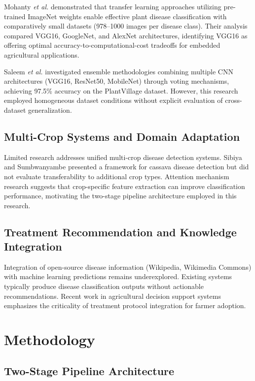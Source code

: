 \documentclass[conference]{IEEEtran}
\begin{document}
Mohanty \textit{et al.} \cite{ref03} demonstrated that transfer learning approaches utilizing pre-trained ImageNet weights enable effective plant disease classification with comparatively small datasets (978--1000 images per disease class). Their analysis compared VGG16, GoogleNet, and AlexNet architectures, identifying VGG16 as offering optimal accuracy-to-computational-cost tradeoffs for embedded agricultural applications.

Saleem \textit{et al.} \cite{ref04} investigated ensemble methodologies combining multiple CNN architectures (VGG16, ResNet50, MobileNet) through voting mechanisms, achieving 97.5\% accuracy on the PlantVillage dataset. However, this research employed homogeneous dataset conditions without explicit evaluation of cross-dataset generalization.

\subsection{Multi-Crop Systems and Domain Adaptation}

Limited research addresses unified multi-crop disease detection systems. Sibiya and Sumbwanyambe \cite{ref05} presented a framework for cassava disease detection but did not evaluate transferability to additional crop types. Attention mechanism research \cite{ref06} suggests that crop-specific feature extraction can improve classification performance, motivating the two-stage pipeline architecture employed in this research.

\subsection{Treatment Recommendation and Knowledge Integration}

Integration of open-source disease information (Wikipedia, Wikimedia Commons) with machine learning predictions remains underexplored. Existing systems typically produce disease classification outputs without actionable recommendations. Recent work in agricultural decision support systems \cite{ref07} emphasizes the criticality of treatment protocol integration for farmer adoption.

\section{Methodology}
\label{sec:methodology}

\subsection{Two-Stage Pipeline Architecture}
\end{document}
